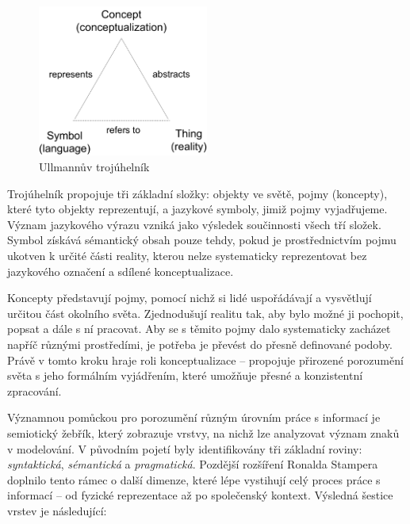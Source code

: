 \begin{figure}[H]
  \centering
  \includegraphics[width=0.5\textwidth]{images/ullmann_triangle.png}
  \caption{Ullmannův trojúhelník \cite{Ullmann1964}}
  \label{fig:ullmann_triangle}
\end{figure}

Trojúhelník propojuje tři základní složky: objekty ve světě, pojmy (koncepty), které tyto objekty reprezentují, a jazykové symboly, jimiž pojmy vyjadřujeme. Význam jazykového výrazu vzniká jako výsledek součinnosti všech tří složek. Symbol získává sémantický obsah pouze tehdy, pokud je prostřednictvím pojmu ukotven k určité části reality, kterou nelze systematicky reprezentovat bez jazykového označení a sdílené konceptualizace.\cite{Ogden1923}

Koncepty představují pojmy, pomocí nichž si lidé uspořádávají a vysvětlují určitou část okolního světa. Zjednodušují realitu tak, aby bylo možné ji pochopit, popsat a dále s ní pracovat. Aby se s těmito pojmy dalo systematicky zacházet napříč různými prostředími, je potřeba je převést do přesně definované podoby. Právě v tomto kroku hraje roli konceptualizace – propojuje přirozené porozumění světa s jeho formálním vyjádřením, které umožňuje přesné a konzistentní zpracování. \cite{Pergl2018,Uschold2004}

Významnou pomůckou pro porozumění různým úrovním práce s informací je semiotický žebřík, který zobrazuje vrstvy, na nichž lze analyzovat význam znaků v modelování. V původním pojetí byly identifikovány tři základní roviny: \textit{syntaktická}, \textit{sémantická} a \textit{pragmatická}. \cite{Stamper1973} Pozdější rozšíření Ronalda Stampera doplnilo tento rámec o další dimenze, které lépe vystihují celý proces práce s informací – od fyzické reprezentace až po společenský kontext. \cite{Pergl2018} Výsledná šestice vrstev je následující:

